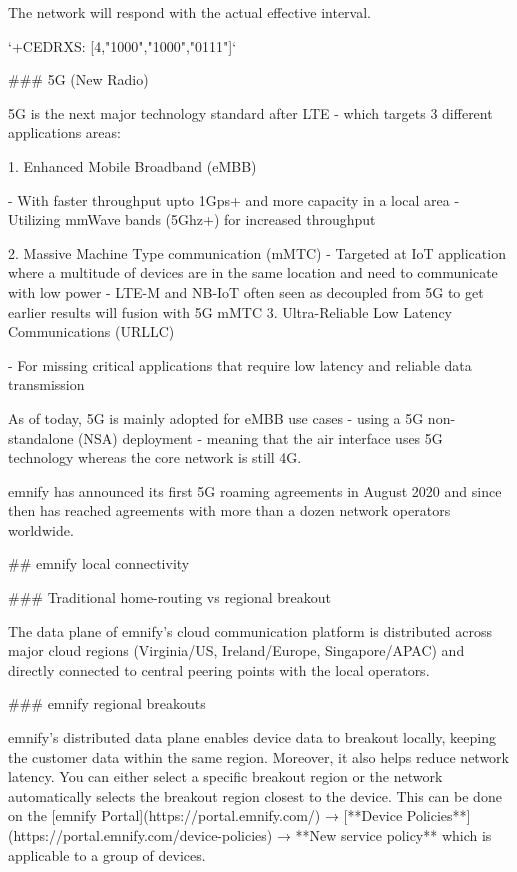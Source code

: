 \documentclass[11pt, oneside]{article}   	%
\newcommand{\addspace}{\vspace{2mm}}
\begin{document}
\begin{markdown}
The network will respond with the actual effective interval.
    
`+CEDRXS: [4,"1000","1000","0111"]`    

### 5G (New Radio)

5G is the next major technology standard after LTE - which targets 3 different applications areas:
\end{markdown}
\addspace
\begin{markdown}
1. Enhanced Mobile Broadband (eMBB)
\end{markdown}
\addspace
\begin{markdown}
  - With faster throughput upto 1Gps+ and more capacity in a local area
  - Utilizing mmWave bands (5Ghz+) for increased throughput
\end{markdown}
\addspace
\begin{markdown}
2. Massive Machine Type communication (mMTC)  
  - Targeted at IoT application where a multitude of devices are in the same location and need to communicate with low power
  - LTE-M and NB-IoT often seen as decoupled from 5G to get earlier results will fusion with 5G mMTC  
3. Ultra-Reliable Low Latency Communications (URLLC)
\end{markdown}
\addspace
\begin{markdown}
  - For missing critical applications that require low latency and reliable data transmission
\end{markdown}
\addspace
\begin{markdown}
As of today, 5G is mainly adopted for eMBB use cases - using a 5G non-standalone (NSA) deployment - meaning that the air interface uses 5G technology whereas the core network is still 4G.

emnify has announced its first 5G roaming agreements in August 2020 and since then has reached agreements with more than a dozen network operators worldwide.

## emnify local connectivity

### Traditional home-routing vs regional breakout

The data plane of emnify’s cloud communication platform is distributed across major cloud regions (Virginia/US, Ireland/Europe, Singapore/APAC) and directly connected to central peering points with the local operators.

### emnify regional breakouts

emnify’s distributed data plane enables device data to breakout locally, keeping the customer data within the same region.
Moreover, it also helps reduce network latency.
You can either select a specific breakout region or the network automatically selects the breakout region closest to the device.
This can be done on the [emnify Portal](https://portal.emnify.com/) → [**Device Policies**](https://portal.emnify.com/device-policies) → **New service policy** which is applicable to a group of devices.

\end{markdown}
\end{document}
